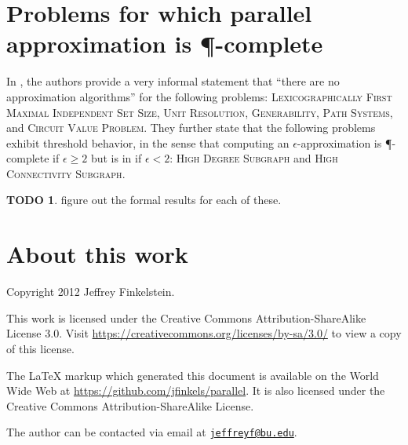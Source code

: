 \documentclass[]{article}
\theoremstyle{definition} \newtheorem{definition}{Definition}
\theoremstyle{definition} \newtheorem{openquestion}{Open question}
\newtheorem{todo}{TODO}
\newcommand{\email}[1]{\href{mailto:#1}{\nolinkurl{#1}}}
\begin{document}
\section{Problems for which parallel approximation is \texorpdfstring{\P}{P}-complete}
\label{sec:approximationispcomplete}

In \cite[Section~10.2]{ghr95}, the authors provide a very informal statement that ``there are no \NC{} approximation algorithms'' for the following problems: \textsc{Lexicographically First Maximal Independent Set Size}, \textsc{Unit Resolution}, \textsc{Generability}, \textsc{Path Systems}, and \textsc{Circuit Value Problem}.
They further state that the following problems exhibit threshold behavior, in the sense that computing an $\epsilon$-approximation is \P-complete if $\epsilon\geq 2$ but is in \NCAS{} if $\epsilon<2$: \textsc{High Degree Subgraph} and \textsc{High Connectivity Subgraph}.

\begin{todo}
  figure out the formal results for each of these.
\end{todo}

\section{About this work}

Copyright 2012 Jef{}frey Finkelstein.

This work is licensed under the Creative Commons Attribution-ShareAlike License 3.0.
Visit \mbox{\url{https://creativecommons.org/licenses/by-sa/3.0/}} to view a copy of this license.

The \LaTeX{} markup which generated this document is available on the World Wide Web at \mbox{\url{https://github.com/jfinkels/parallel}}.
It is also licensed under the Creative Commons Attribution-ShareAlike License.

The author can be contacted via email at \email{jeffreyf@bu.edu}.



\end{document}
